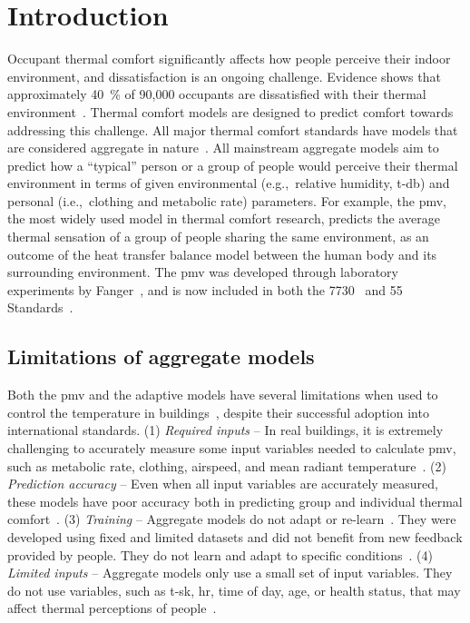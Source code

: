 \section{Introduction}\label{sec:introduction}
Occupant thermal comfort significantly affects how people perceive their indoor environment, and dissatisfaction is an ongoing challenge.
Evidence shows that approximately 40~\% of 90,000 occupants are dissatisfied with their thermal environment~\cite{Graham2021-en}.
Thermal comfort models are designed to predict comfort towards addressing this challenge.
All major thermal comfort standards have models that are considered aggregate in nature~\cite{iso7730, ASHRAE552020}.
All mainstream aggregate models aim to predict how a ``typical'' person or a group of people would perceive their thermal environment in terms of given environmental (e.g.,\ relative humidity, \ac{t-db}) and personal (i.e.,\ clothing and metabolic rate) parameters.
For example, the \ac{pmv}, the most widely used model in thermal comfort research, predicts the average thermal sensation of a group of people sharing the same environment, as an outcome of the heat transfer balance model between the human body and its surrounding environment.
The \ac{pmv} was developed through laboratory experiments by Fanger~\cite{Fanger1970}, and is now included in both the \gls{7730}~\cite{iso7730} and \gls{55} Standards~\cite{ASHRAE552020}.

\subsection{Limitations of aggregate models}\label{subsec:limitations_aggregate}
Both the \ac{pmv} and the adaptive models have several limitations when used to control the temperature in buildings~\cite{Kim2018a, Xie2020, deDear2013IndoorAir}, despite their successful adoption into international standards.
(1) \textit{Required inputs} -- In real buildings, it is extremely challenging to accurately measure some input variables needed to calculate \ac{pmv}, such as metabolic rate, clothing, airspeed, and mean radiant temperature~\cite{VanHoof2008}.
(2) \textit{Prediction accuracy} -- Even when all input variables are accurately measured, these models have poor accuracy both in predicting group and individual thermal comfort~\cite{Cheung2019}.
(3) \textit{Training} -- Aggregate models do not adapt or re-learn~\cite{Xie2020}.
They were developed using fixed and limited datasets and did not benefit from new feedback provided by people.
They do not learn and adapt to specific conditions~\cite{Kim2018a}.
(4) \textit{Limited inputs} -- Aggregate models only use a small set of input variables.
They do not use variables, such as \ac{t-sk}, \ac{hr}, time of day, age, or health status, that may affect thermal perceptions of people~\cite{Kim2018a}.

